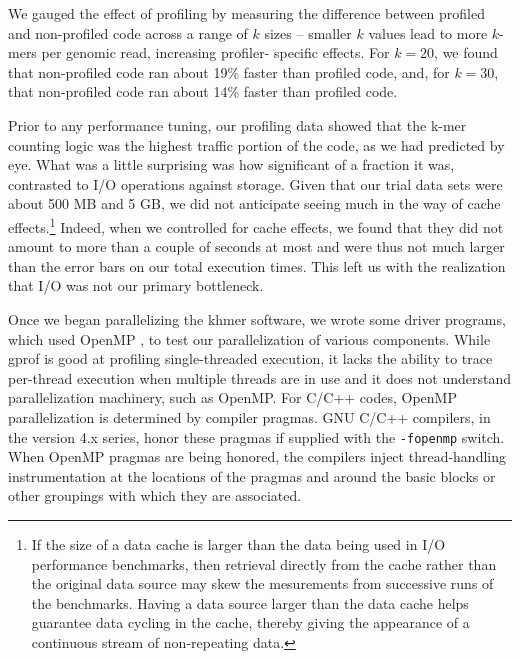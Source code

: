 \documentclass{article}
\begin{document}
We gauged the effect of profiling by measuring the difference between
profiled and non-profiled code across a range of $k$ sizes -- smaller
$k$ values lead to more $k$-mers per genomic read, increasing
profiler- specific effects.  For $k = 20$, we found that non-profiled
code ran about 19\% faster than profiled code, and, for $k = 30$, that
non-profiled code ran about 14\% faster than profiled code.


Prior to any performance tuning, our profiling data showed that the k-mer
counting logic was the highest traffic portion of the code, as we had predicted
by eye. What was a little surprising was how significant of a fraction it was,
contrasted to I/O operations against storage. Given that our trial data sets
were about 500 MB and 5 GB, we did not anticipate seeing much in the way of
cache effects.\footnote{If the size of a data cache is larger than the data
being used in I/O performance benchmarks, then retrieval directly from the
cache rather than the original data source may skew the mesurements from
successive runs of the benchmarks. Having a data source larger than the data
cache helps guarantee data cycling in the cache, thereby giving the appearance
of a continuous stream of non-repeating data.} Indeed, when we controlled for
cache effects, we found that they did not amount to more than a couple of
seconds at most and were thus not much larger than the error bars on our total
execution times.  This left us with the realization that I/O was not our
primary bottleneck.

Once we began parallelizing the khmer software, we wrote some driver programs,
which used OpenMP \citep{web:OpenMP}, to test our parallelization of various
components. While gprof is good at profiling single-threaded execution, it
lacks the ability to trace per-thread execution when multiple threads are in
use and it does not understand parallelization machinery, such as OpenMP. For
C/C++ codes, OpenMP parallelization is determined by compiler pragmas. GNU
C/C++ compilers, in the version 4.x series, honor these pragmas if supplied
with the \texttt{-fopenmp} switch. When OpenMP pragmas are being honored, the
compilers inject thread-handling instrumentation at the locations of the
pragmas and around the basic blocks or other groupings with which they are
associated.
\end{document}
